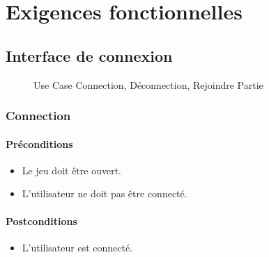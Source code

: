 \documentclass[a4paper,11pt]{report}
\begin{document}
\section{Exigences fonctionnelles}
\subsection{Interface de connexion}
\begin{figure}[ht]
    \caption{Use Case Connection, Déconnection, Rejoindre Partie}
\end{figure}
\newpage
\subsubsection{Connection}
\paragraph{Préconditions}
\begin{itemize}
 \item Le jeu doit être ouvert.
 \item L'utilisateur ne doit pas être connecté.
\end{itemize}
\paragraph{Postconditions}
\begin{itemize}
 \item L'utilisateur est connecté.
\end{itemize}
\end{document}

